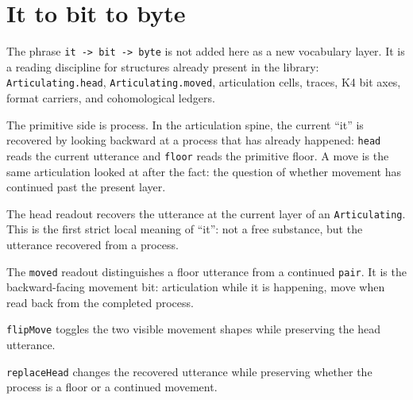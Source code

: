 \section{It to bit to byte}

The phrase \texttt{it -> bit -> byte} is not added here as a new vocabulary
layer.  It is a reading discipline for structures already present in the
library: \texttt{Articulating.head}, \texttt{Articulating.moved}, articulation
cells, traces, K4 bit axes, format carriers, and cohomological ledgers.

The primitive side is process.  In the articulation spine, the current
``it'' is recovered by looking backward at a process that has already happened:
\texttt{head} reads the current utterance and \texttt{floor} reads the primitive
floor.  A move is the same articulation looked at after the fact: the question
of whether movement has continued past the present layer.

\begin{definition}\label{def:articulating-head-it}\leanok{}
The head readout recovers the utterance at the current layer of an
\texttt{Articulating}.  This is the first strict local meaning of ``it'': not a
free substance, but the utterance recovered from a process.
\end{definition}

\begin{definition}\label{def:articulating-moved}\leanok{}
The \texttt{moved} readout distinguishes a floor utterance from a continued
\texttt{pair}.  It is the backward-facing movement bit: articulation while it is
happening, move when read back from the completed process.
\end{definition}

\begin{definition}\label{def:articulating-flip-move}\leanok{}
\texttt{flipMove} toggles the two visible movement shapes while preserving the
head utterance.
\end{definition}

\begin{definition}\label{def:articulating-replace-head}\leanok{}
\texttt{replaceHead} changes the recovered utterance while preserving whether
the process is a floor or a continued movement.
\end{definition}

